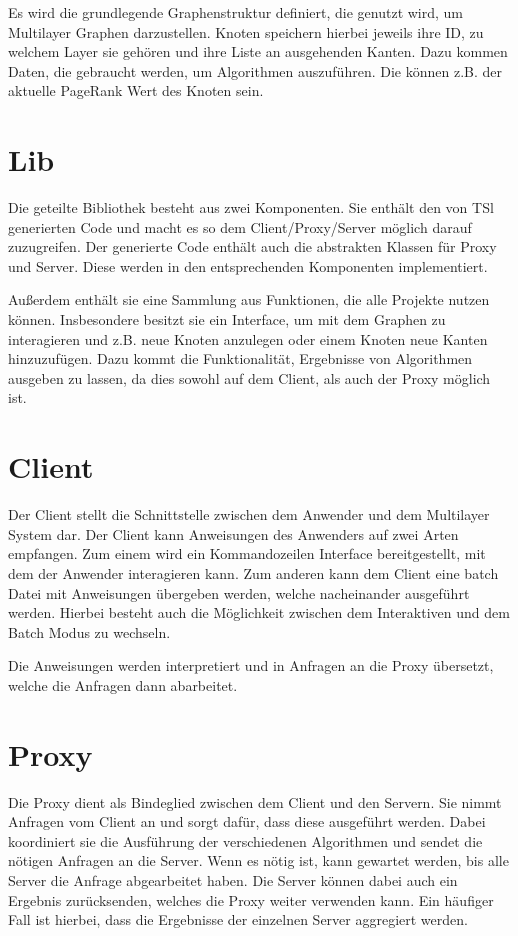 Es wird die grundlegende Graphenstruktur definiert, die genutzt wird, um Multilayer Graphen darzustellen. Knoten speichern hierbei jeweils ihre ID, zu welchem Layer sie gehören
und ihre Liste an ausgehenden Kanten. Dazu kommen Daten, die gebraucht werden, um Algorithmen auszuführen. Die können z.B. der aktuelle PageRank Wert des Knoten sein.


\section{Lib}

Die geteilte Bibliothek besteht aus zwei Komponenten. Sie enthält den von TSl generierten Code und macht es so dem Client/Proxy/Server möglich darauf zuzugreifen. Der generierte Code enthält auch die abstrakten Klassen für Proxy und Server. Diese werden in den entsprechenden Komponenten implementiert. 

Außerdem enthält sie eine Sammlung aus Funktionen, die alle Projekte nutzen können. Insbesondere besitzt sie ein Interface, um mit dem Graphen zu interagieren und z.B. neue Knoten anzulegen oder einem Knoten neue Kanten hinzuzufügen.
Dazu kommt die Funktionalität, Ergebnisse von Algorithmen ausgeben zu lassen, da dies sowohl auf dem Client, als auch der Proxy möglich ist.


\section{Client}

Der Client stellt die Schnittstelle zwischen dem Anwender und dem Multilayer System dar. Der Client kann Anweisungen des Anwenders auf zwei Arten empfangen.
Zum einem wird ein Kommandozeilen Interface bereitgestellt, mit dem der Anwender interagieren kann. Zum anderen kann dem Client eine batch Datei mit Anweisungen übergeben werden,
welche nacheinander ausgeführt werden.
Hierbei besteht auch die Möglichkeit zwischen dem Interaktiven und dem Batch Modus zu wechseln.

Die Anweisungen werden interpretiert und in Anfragen an die Proxy übersetzt, welche die Anfragen dann abarbeitet.

\section{Proxy}

Die Proxy dient als Bindeglied zwischen dem Client und den Servern. Sie nimmt Anfragen vom Client an und sorgt dafür, dass diese ausgeführt werden.
Dabei koordiniert sie die Ausführung der verschiedenen Algorithmen und sendet die nötigen Anfragen an die Server. Wenn es nötig ist, kann gewartet werden,
bis alle Server die Anfrage abgearbeitet haben. Die Server können dabei auch ein Ergebnis zurücksenden, welches die Proxy weiter verwenden kann. Ein häufiger Fall
ist hierbei, dass die Ergebnisse der einzelnen Server aggregiert werden.


